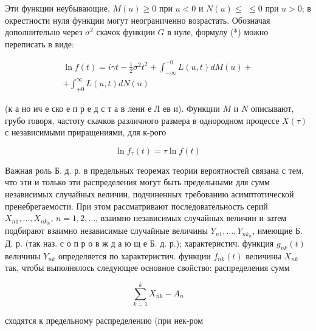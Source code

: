 \documentclass[10pt]{article}
\begin{document}
Эти функции неубывающие, $M(u) \geqslant 0$ при $u<0$ и $N(u) \leqslant$ $\leqslant 0$ при $u>0$; в окрестности нуля функции могут неограниченно возрастать. Обозначая дополнительно через $\sigma^{2}$ скачок функции $G$ в нуле, формулу (*) можно переписать в виде:



\[

\begin{gathered}

\ln f(t)=i \gamma t-\frac{1}{2} \sigma^{2} t^{2}+\int_{-\infty}^{-0} L(u, t) d M(u)+ \\

+\int_{+0}^{\infty} L(u, t) d N(u)

\end{gathered}

\]



(к а но ич е ско е п р е д с т а в лени е Л ев и). Функции $M$ и $N$ описывают, грубо говоря, частоту скачков различного размера в однородном процессе $X(\tau)$ с независимыми приращениями, для к-рого



\[

\ln f_{\tau}(t)=\tau \ln f(t)

\]



Важная роль Б. д. р. в предельных теоремах теории вероятностей связана с тем, что эти и только эти распределения могут быть предельными для сумм независимых случайных величин, подчиненных требованию асимптотической пренебрегаемости. При этом рассматривают последовательность серий $X_{n 1}, \ldots, X_{n k_{n}}$, $n=1,2, \ldots$, взаимно независимых случайных величин и затем подбирают взаимно независимые случайные величины $Y_{n 1}, \ldots, Y_{n k_{n}}$, имеющие Б. Д. р. (так наз. с о п р о в ж д а ю щ е Б. д. р.); характеристич. функция $g_{n k}(t)$ величины $Y_{n k}$ определяется по характеристич. функции $f_{n k}(t)$ величины $X_{n k}$ так, чтобы выполнялось следующее основное свойство: распределения сумм



\[

\sum_{k=1}^{k} X_{n k}-A_{n}

\]



сходятся к предельному распределению (при нек-ром
\end{document}
